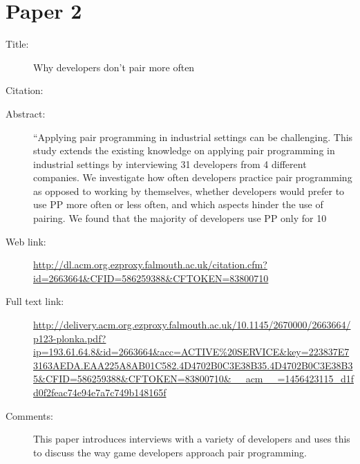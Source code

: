 \documentclass{scrartcl}
\begin{document}
\section*{Paper 2}
\begin{description}
\item[Title:] Why developers don't pair more often
\item[Citation:] \cite{Plonka:2012}
\item[Abstract:] ``Applying pair programming in industrial settings can be challenging. This study extends the existing knowledge on applying pair programming in industrial settings by interviewing 31 developers from 4 different companies. We investigate how often developers practice pair programming as opposed to working by themselves, whether developers would prefer to use PP more often or less often, and which aspects hinder the use of pairing. We found that the majority of developers use PP only for 10%
\item[Web link:]  \url{http://dl.acm.org.ezproxy.falmouth.ac.uk/citation.cfm?id=2663664&CFID=586259388&CFTOKEN=83800710}
\item[Full text link:] \url{http://delivery.acm.org.ezproxy.falmouth.ac.uk/10.1145/2670000/2663664/p123-plonka.pdf?ip=193.61.64.8&id=2663664&acc=ACTIVE%20SERVICE&key=223837E73163AEDA.EAA225A8AB01C582.4D4702B0C3E38B35.4D4702B0C3E38B35&CFID=586259388&CFTOKEN=83800710&__acm__=1456423115_d1fd0f2feac74e94e7a7c749b148165f}
\item[Comments:] This paper introduces interviews with a variety of developers and uses this to discuss the way game developers approach pair programming.
\end{description}
\end{document}

